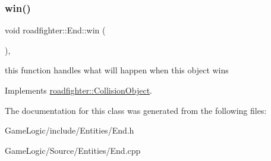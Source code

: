 \mbox{\label{classroadfighter_1_1End_abcf20b9e8a2dda73a9215eb8c01c4aef}} 
\subsubsection{\texorpdfstring{win()}{win()}}
{\footnotesize\ttfamily void roadfighter\+::\+End\+::win (\begin{DoxyParamCaption}{ }\end{DoxyParamCaption})\hspace{0.3cm}{\ttfamily [override]}, {\ttfamily [virtual]}}

this function handles what will happen when this object wins 

Implements \hyperlink{classroadfighter_1_1CollisionObject_a03ce1ae52676088839d85c597743052c}{roadfighter\+::\+Collision\+Object}.



The documentation for this class was generated from the following files\+:\begin{DoxyCompactItemize}
\item 
Game\+Logic/include/\+Entities/End.\+h\item 
Game\+Logic/\+Source/\+Entities/End.\+cpp\end{DoxyCompactItemize}
